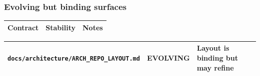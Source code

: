 \documentclass[9pt,a4paper,openany]{book}
\newcommand{\toprule}{\hline}
\newcommand{\midrule}{\hline}
\newcommand{\bottomrule}{\hline}
\begin{document}
\subsubsection{Evolving but binding surfaces}


\begin{center}
{\small\renewcommand{\arraystretch}{1.18}
\begin{tabularx}{\linewidth}{@{}>{\raggedright\arraybackslash}X >{\raggedright\arraybackslash}X >{\raggedright\arraybackslash}X@{}}
\toprule
\textbf{Contract} & \textbf{Stability} & \textbf{Notes} \\
\midrule
\bottomrule
\end{tabularx}
}
\end{center}





\begin{center}
{\small\renewcommand{\arraystretch}{1.18}
\begin{tabularx}{\linewidth}{@{}>{\raggedright\arraybackslash}X >{\raggedright\arraybackslash}X >{\raggedright\arraybackslash}X@{}}
\toprule
\textbf{\texttt{docs/\allowbreak{}architecture/\allowbreak{}ARCH\_\allowbreak{}REPO\_\allowbreak{}LAYOUT.\allowbreak{}md}} & \textbf{EVOLVING} & \textbf{Layout is binding but may refine} \\
\midrule
\bottomrule
\end{tabularx}
}
\end{center}
\end{document}
